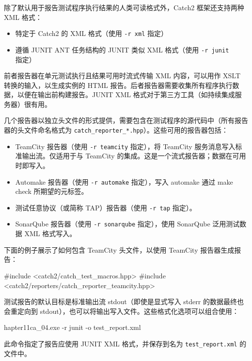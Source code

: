 
除了默认用于报告测试程序执行结果的人类可读格式外，Catch2 框架还支持两种 XML 格式：

\begin{itemize}
\item
特定于 Catch2 的 XML 格式（使用 \verb|-r xml| 指定）

\item
遵循 JUNIT ANT 任务结构的 JUNIT 类似 XML 格式（使用 \verb|-r junit| 指定）
\end{itemize}

前者报告器在单元测试执行且结果可用时流式传输 XML 内容，可以用作 XSLT 转换的输入，以生成实例的 HTML 报告。后者报告器需要收集所有程序执行数据，以便在输出前构建报告。JUNIT XML 格式对于第三方工具（如持续集成服务器）很有用。

几个报告器以独立头文件的形式提供，需要包含在测试程序的源代码中（所有报告器的头文件命名格式为 \verb|catch_reporter_*.hpp|）。这些可用的报告器包括：

\begin{itemize}
\item
TeamCity 报告器（使用 \verb|-r teamcity| 指定），将 TeamCity 服务消息写入标准输出流。仅适用于与 TeamCity 的集成。这是一个流式报告器；数据在可用时即写入。

\item
Automake 报告器（使用 \verb|-r automake| 指定），写入 automake 通过 make check 所期望的元标签。

\item
测试任意协议（或简称 TAP）报告器（使用 \verb|-r tap| 指定）。

\item
SonarQube 报告器（使用 \verb|-r sonarqube| 指定），使用 SonarQube 泛用测试数据 XML 格式写入。
\end{itemize}

下面的例子展示了如何包含 TeamCity 头文件，以使用 TeamCity 报告器生成报告：

\begin{cpp}
#include <catch2/catch_test_macros.hpp>
#include <catch2/reporters/catch_reporter_teamcity.hpp>
\end{cpp}

测试报告的默认目标是标准输出流 stdout（即使是显式写入 stderr 的数据最终也会重定向到 stdout），也可以将输出写入文件。这些格式化选项可以组合使用：

\begin{shell}
hapter11ca_04.exe -r junit -o test_report.xml
\end{shell}

此命令指定了报告应使用 JUNIT XML 格式，并保存到名为 \verb|test_report.xml| 的文件中。

